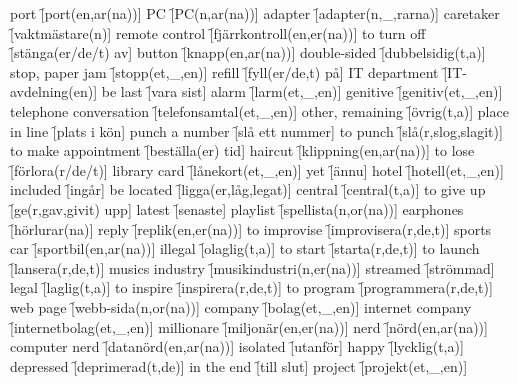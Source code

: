 \begin{questions}
\begin{multicols}{2}
        \question port \f[port(en,ar(na))]
        \question PC \f[PC(n,ar(na))]
        \question adapter \f[adapter(n,\_,rarna)]
        \question caretaker \f[vaktmästare(n)]
        \question remote control \f[fjärrkontroll(en,er(na))]
        \question to turn off \f[stänga(er/de/t) av]
        \question button \f[knapp(en,ar(na))]
        \question double-sided \f[dubbelsidig(t,a)]
        \question stop, paper jam \f[stopp(et,\_,en)]
        \question refill \f[fyll(er/de,t) på]
        \question IT department \f[IT-avdelning(en)]
        \question be last \f[vara sist]
        \question alarm \f[larm(et,\_,en)]
        \question genitive \f[genitiv(et,\_,en)]
        \question telephone conversation \f[telefonsamtal(et,\_,en)]
        \question other, remaining \f[övrig(t,a)]
        \question place in line \f[plats i kön]
        \question punch a number \f[slå ett nummer]
        \question to punch \f[slå(r,slog,slagit)]
        \question to make appointment \f[beställa(er) tid]
        \question haircut \f[klippning(en,ar(na))]
        \question to lose \f[förlora(r/de/t)]
        \question library card \f[lånekort(et,\_,en)]
        \question yet \f[ännu]
        \question hotel \f[hotell(et,\_,en)]
        \question included \f[ingår]
        \question be located \f[ligga(er,låg,legat)]
        \question central \f[central(t,a)]
        \question to give up \f[ge(r,gav,givit) upp]
        \question latest \f[senaste]
        \question playlist \f[spellista(n,or(na))]
        \question earphones \f[hörlurar(na)]
        \question reply \f[replik(en,er(na))]
        \question to improvise \f[improvisera(r,de,t)]
        \question sports car \f[sportbil(en,ar(na))]
        \question illegal \f[olaglig(t,a)]
        \question to start \f[starta(r,de,t)]
        \question to launch \f[lansera(r,de,t)]
        \question musics industry \f[musikindustri(n,er(na))]
        \question streamed \f[strömmad]
        \question legal \f[laglig(t,a)]
        \question to inspire \f[inspirera(r,de,t)]
        \question to program \f[programmera(r,de,t)]
        \question web page \f[webb-sida(n,or(na))]
        \question company \f[bolag(et,\_,en)]
        \question internet company \f[internetbolag(et,\_,en)]
        \question millionare \f[miljonär(en,er(na))]
        \question nerd \f[nörd(en,ar(na))]
        \question computer nerd \f[datanörd(en,ar(na))]
        \question isolated \f[utanför]
        \question happy \f[lycklig(t,a)]
        \question depressed \f[deprimerad(t,de)]
        \question in the end \f[till slut]
        \question project \f[projekt(et,\_,en)]

\end{multicols}
\end{questions}
